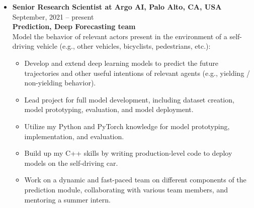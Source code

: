 \documentclass[10pt,letterpaper]{article}
\newcommand{\thing}[2]{{#1} \hfill {#2}}
\begin{document}
\begin{itemize}%

\item \thing{\bf Senior Research Scientist at Argo AI, Palo Alto, CA, USA}{September, 2021 -- present}\\
	{\bf Prediction, Deep Forecasting team}\vspace{0.5em}\\
      	Model the behavior of relevant actors present in the environment of a self-driving vehicle (e.g., other vehicles, bicyclists, pedestrians, etc.):
      	\begin{itemize} \itemsep0em 
      	\vspace{-0.5em}
      		\item Develop and extend deep learning models to predict the future trajectories and other useful intentions of relevant agents (e.g., yielding / non-yielding behavior).
      		\item Lead project for full model development, including dataset creation, model prototyping, evaluation, and model deployment.
      		\item Utilize my Python and PyTorch knowledge for model prototyping, implementation, and evaluation.
      		\item Build up my C++ skills by writing production-level code to deploy models on the self-driving car.
      		\item Work on a dynamic and fast-paced team on different components of the prediction module, collaborating with various team members, and mentoring a summer intern.
	\end{itemize}
	

\end{itemize}
\end{document}
